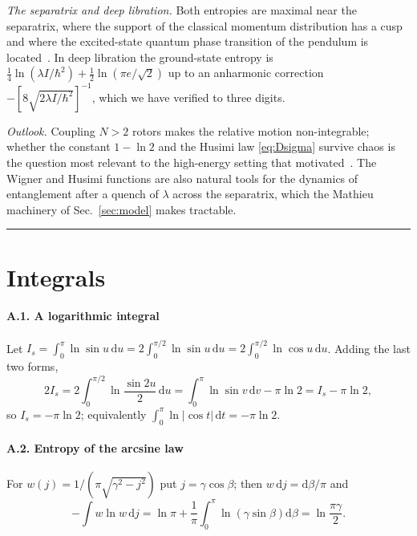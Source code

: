\documentclass[preprint,12pt]{elsarticle}
\newcommand{\dd}{\mathrm{d}}
\begin{document}
\emph{The separatrix and deep libration.} Both entropies are maximal near the
separatrix, where the support of the classical momentum distribution has a cusp
and where the excited-state quantum phase transition of the pendulum is
located~\cite{CaprioCejnarIachello,Stransky,Cejnar}. In deep libration the
ground-state entropy is $\tfrac14\ln(\lambda I/\hbar^{2})+\tfrac12\ln(\pi e/\sqrt2)$
up to an anharmonic correction $-[8\sqrt{2\lambda I/\hbar^{2}}]^{-1}$, which we
have verified to three digits.

\emph{Outlook.} Coupling $N>2$ rotors makes the relative motion non-integrable;
whether the constant $1-\ln2$ and the Husimi law \eqref{eq:Dsigma} survive chaos
is the question most relevant to the high-energy setting that
motivated~\cite{DKS}. The Wigner and Husimi functions are also natural tools
for the dynamics of entanglement after a quench of $\lambda$ across the
separatrix, which the Mathieu machinery of Sec.~\ref{sec:model} makes
tractable.

\begin{center}\rule{0.4\linewidth}{0.4pt}\end{center}

\appendix

\section{Integrals}
\label{app:integrals}

\paragraph{A.1. A logarithmic integral} Let
$I_{s}=\int_{0}^{\pi}\ln\sin u\,\dd u=2\int_{0}^{\pi/2}\ln\sin u\,\dd u
=2\int_{0}^{\pi/2}\ln\cos u\,\dd u$. Adding the last two forms,
\begin{equation}
2I_{s}=2\int_{0}^{\pi/2}\ln\frac{\sin2u}{2}\,\dd u
=\int_{0}^{\pi}\ln\sin v\,\dd v-\pi\ln2=I_{s}-\pi\ln2,
\end{equation}
so $I_{s}=-\pi\ln2$; equivalently $\int_{0}^{\pi}\ln|\cos t|\,\dd t=-\pi\ln2$.

\paragraph{A.2. Entropy of the arcsine law} For $w(j)=1/(\pi\sqrt{\gamma^{2}-j^{2}})$
put $j=\gamma\cos\beta$; then $w\,\dd j=\dd\beta/\pi$ and
\begin{equation}
-\int w\ln w\,\dd j=\ln\pi+\frac{1}{\pi}\int_{0}^{\pi}\ln\left(\gamma\sin\beta\right)
\dd\beta=\ln\frac{\pi\gamma}{2}.
\end{equation}
\end{document}

